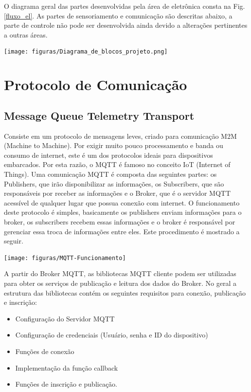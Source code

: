 	O diagrama geral das partes desenvolvidas pela área de eletrônica consta na Fig.\ref{fluxo_el}. As partes de sensoriamento e comunicação são descritas abaixo, a parte de controle não pode ser desenvolvida ainda devido a alterações pertinentes a outras áreas.

    \begin{center}
    	\texttt{[image: figuras/Diagrama\_de\_blocos\_projeto.png]}
        \label{fluxo_el}
    \end{center}

\section{Protocolo de Comunicação}
\subsection{Message Queue Telemetry Transport}
	Consiste em um protocolo de mensagens leves, criado para comunicação M2M (Machine to Machine). Por exigir muito pouco processamento e banda ou consumo de internet, este é um dos protocolos ideais para dispositivos embarcados. Por esta razão, o MQTT é famoso no conceito IoT (Internet of Things).
	Uma comunicação MQTT é composta das seguintes partes: os Publishers, que irão disponibilizar as informações, os Subscribers, que são responsáveis por receber as informações e o Broker, que é o servidor MQTT acessível de qualquer lugar que possua conexão com internet.
	O funcionamento deste protocolo é simples, basicamente os publishers enviam informações para o broker, os subscribers recebem essas informações e o broker é responsável por gerenciar essa troca de informações entre eles. Este procedimento é mostrado a seguir.
    \begin{center}
    	\texttt{[image: figuras/MQTT-Funcionamento]}
        \label{mqtt}
    \end{center}

	A partir do Broker MQTT, as bibliotecas MQTT cliente podem ser utilizadas para obter os serviços de publicação e leitura dos dados do Broker. No geral a estrutura das bibliotecas contém os seguintes requisitos para conexão, publicação e inscrição:
    \begin{itemize}
    \item
    	Configuração do Servidor MQTT
   	\item
    	Configuração de credenciais (Usuário, senha e ID do dispositivo)
    \item
   	 	Funções de conexão
    \item
   	 	Implementação da função callback
    \item
    	Funções de inscrição e publicação.
    \end{itemize}

